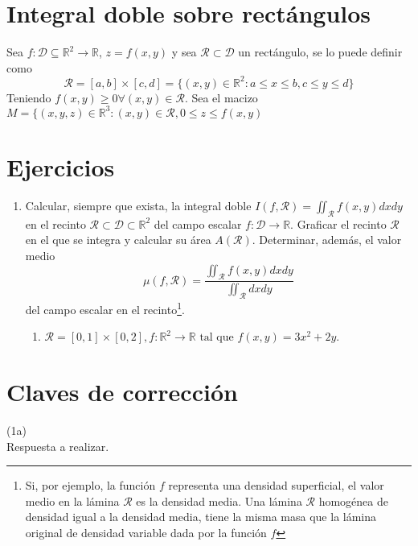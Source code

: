 \section{Integral doble sobre rect\'angulos}

Sea $f: \mathcal{D} \subseteq \mathbb{R}^2 \rightarrow \mathbb{R}$, $z = f(x,y)$ y sea $\mathcal{R} \subset \mathcal{D}$ un rect\'angulo, se lo puede definir como
$$
\mathcal{R} = \left[a,b\right] \times \left[c,d\right] = \lbrace (x,y) \in \mathbb{R}^2: a \leq x \leq b, c \leq y \leq d \rbrace
$$
Teniendo $f(x,y) \geq 0 \forall(x,y) \in \mathcal{R}$. Sea el macizo $M = \lbrace (x,y,z) \in \mathbb{R}^3: (x,y) \in \mathcal{R},0 \leq z\leq f(x,y)$



\section{Ejercicios}

\begin{enumerate}

\item Calcular, siempre que exista, la integral doble $I(f,\mathcal{R}) = \iint_{\mathcal{R}}f(x,y)dxdy$ en el recinto $\mathcal{R} \subset \mathcal{D} \subset \mathbb{R}^2$ del campo escalar $f: \mathcal{D} \rightarrow \mathbb{R}$. Graficar el recinto $\mathcal{R}$ en el que se integra y calcular su \'area $A(\mathcal{R})$. Determinar, adem\'as, el valor medio $$\mu(f,\mathcal{R}) = \frac{\iint_{\mathcal{R}}f(x,y)dxdy}{\iint_{\mathcal{R}}dxdy}$$ del campo escalar en el recinto\footnote{Si, por ejemplo, la funci\'on $f$ representa una densidad superficial, el valor medio en la l\'amina $\mathcal{R}$ es la densidad media. Una l\'amina $\mathcal{R}$ homog\'enea de densidad igual a la densidad media, tiene la misma masa que la l\'amina original de densidad variable dada por la funci\'on $f$}.
\begin{enumerate}
	\item $\mathcal{R} = \left[ 0, 1 \right] \times \left[ 0, 2 \right], f: \mathbb{R}^2 \rightarrow \mathbb{R} \textrm{ tal que } f(x,y) = 3x^2 + 2y$.
\end{enumerate}

\end{enumerate}

\section{Claves de correcci\'on}

\begin{exercise}

(1a)\\
Respuesta a realizar.


\end{exercise}